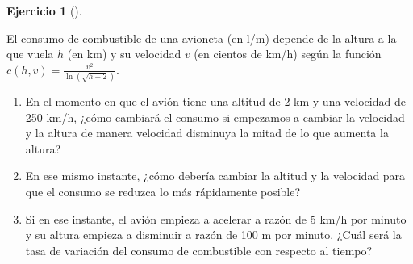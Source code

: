 \documentclass[
  a4paper,
]{scrreport}
\theoremstyle{definition}
\newtheorem{exercise}{Ejercicio}[chapter]
\theoremstyle{remark}
\begin{document}
\begin{exercise}[]\protect\hypertarget{exr-3}{}\label{exr-3}

El consumo de combustible de una avioneta (en l/m) depende de la altura
a la que vuela \(h\) (en km) y su velocidad \(v\) (en cientos de km/h)
según la función \(c(h,v) = \frac{v^2}{\ln(\sqrt{h+2})}\).

\begin{enumerate}
\def\labelenumi{\alph{enumi}.}
\item
  En el momento en que el avión tiene una altitud de 2 km y una
  velocidad de 250 km/h, ¿cómo cambiará el consumo si empezamos a
  cambiar la velocidad y la altura de manera velocidad disminuya la
  mitad de lo que aumenta la altura?
\item
  En ese mismo instante, ¿cómo debería cambiar la altitud y la velocidad
  para que el consumo se reduzca lo más rápidamente posible?
\item
  Si en ese instante, el avión empieza a acelerar a razón de 5 km/h por
  minuto y su altura empieza a disminuir a razón de 100 m por minuto.
  ¿Cuál será la tasa de variación del consumo de combustible con
  respecto al tiempo?
\end{enumerate}

\end{exercise}
\end{document}
